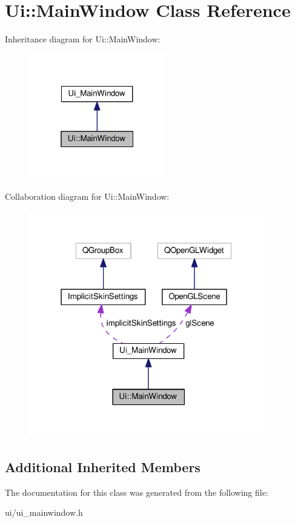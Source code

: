 \hypertarget{classUi_1_1MainWindow}{}\section{Ui\+:\+:Main\+Window Class Reference}
\label{classUi_1_1MainWindow}


Inheritance diagram for Ui\+:\+:Main\+Window\+:\nopagebreak
\begin{figure}[H]
\begin{center}
\leavevmode
\includegraphics[width=169pt]{d5/db9/classUi_1_1MainWindow__inherit__graph}
\end{center}
\end{figure}


Collaboration diagram for Ui\+:\+:Main\+Window\+:\nopagebreak
\begin{figure}[H]
\begin{center}
\leavevmode
\includegraphics[width=291pt]{d2/db6/classUi_1_1MainWindow__coll__graph}
\end{center}
\end{figure}
\subsection*{Additional Inherited Members}


The documentation for this class was generated from the following file\+:\begin{DoxyCompactItemize}
\item 
ui/ui\+\_\+mainwindow.\+h\end{DoxyCompactItemize}
